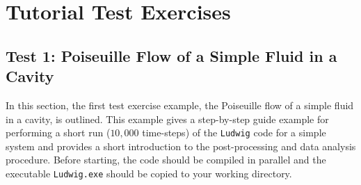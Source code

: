 \documentclass[11pt,twoside,a4paper]{article}
\begin{document}
\section{Tutorial Test Exercises}

\subsection{Test 1: Poiseuille Flow of a Simple Fluid in a Cavity}

In this section, the first test exercise example, the Poiseuille flow of a simple fluid in a cavity, is outlined. This example gives a step-by-step guide example for performing a short run ($10,000$ time-steps) of the \texttt{Ludwig} code for a simple system and provides a short introduction to the post-processing and data analysis procedure. Before starting, the code should be compiled in parallel and the executable \texttt{Ludwig.exe} should be copied to your working directory.
\end{document}
